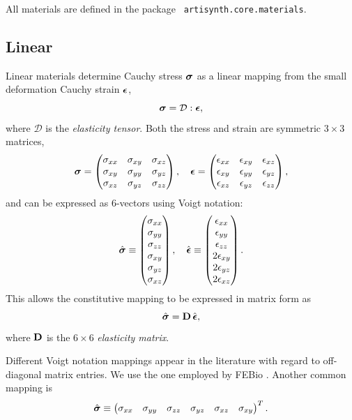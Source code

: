 All materials are defined in the package {\tt
artisynth.core.materials}.

\subsection{Linear}
\label{LinearMaterials:sec}

Linear materials determine Cauchy stress $\boldsymbol\sigma$ as a linear mapping
from the small deformation Cauchy strain $\boldsymbol\epsilon$,
%
\begin{equation}
\boldsymbol\sigma = \mathcal{D} : \boldsymbol\epsilon,
\end{equation}
%
where $\mathcal{D}$ is the {\it elasticity tensor}.
Both the stress and
strain are symmetric $3 \times 3$ matrices,
%
\begin{equation}
\boldsymbol\sigma = \left(\begin{matrix} 
\sigma_{xx} & \sigma_{xy} & \sigma_{xz} \\
\sigma_{xy} & \sigma_{yy} & \sigma_{yz} \\
\sigma_{xz} & \sigma_{yz} & \sigma_{zz}
\end{matrix}\right),
\quad
\boldsymbol\epsilon = \left(\begin{matrix} 
\epsilon_{xx} & \epsilon_{xy} & \epsilon_{xz} \\
\epsilon_{xy} & \epsilon_{yy} & \epsilon_{yz} \\
\epsilon_{xz} & \epsilon_{yz} & \epsilon_{zz}
\end{matrix}\right),
\end{equation}
%
and can be expressed as 6-vectors using Voigt notation:
%
\begin{equation}
\hat{\boldsymbol\sigma} \equiv \left(\begin{matrix} 
\sigma_{xx} \\ \sigma_{yy} \\ \sigma_{zz} \\ 
\sigma_{xy} \\ \sigma_{yz} \\ \sigma_{xz} 
\end{matrix}\right),
\quad
\hat{\boldsymbol\epsilon} \equiv \left(\begin{matrix} 
\epsilon_{xx} \\ \epsilon_{yy} \\ \epsilon_{zz} \\ 
2 \epsilon_{xy} \\ 2 \epsilon_{yz} \\ 2 \epsilon_{xz} 
\end{matrix}\right).
\end{equation}
%
This allows the constitutive mapping to be expressed in
matrix form as
%
\begin{equation}
\hat{\boldsymbol\sigma} = {\bf D} \, \hat{\boldsymbol\epsilon},
\end{equation}
%
where ${\bf D}$ is the $6 \times 6$ {\it elasticity matrix}.

\begin{sideblock}
Different Voigt notation mappings appear in the literature with regard
to off-diagonal matrix entries. We use the one employed by
FEBio \cite{FEBioTheory2018}. Another common mapping is
%
\begin{equation*}
\hat{\boldsymbol\sigma} \equiv \left(\begin{matrix} 
\sigma_{xx} & \sigma_{yy} & \sigma_{zz} & 
\sigma_{yz} & \sigma_{xz} & \sigma_{xy} 
\end{matrix}\right)^T.
\end{equation*}
%
\end{sideblock}

